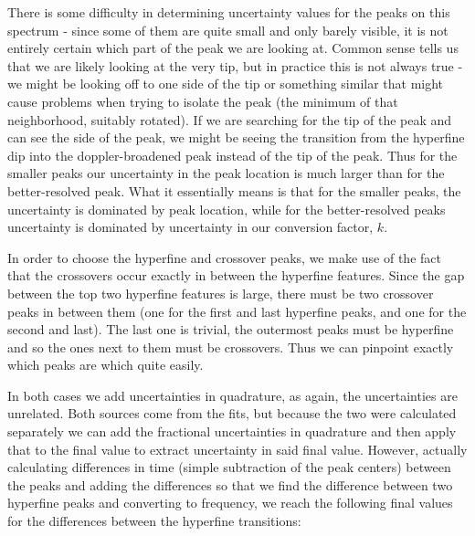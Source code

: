\documentclass{article}
\begin{document}
  There is some difficulty in determining uncertainty values for the peaks on this spectrum - since some of them are quite small and only barely visible, it is not entirely certain which part of the peak we are looking at.  Common sense tells us that we are likely looking at the very tip, but in practice this is not always true - we might be looking off to one side of the tip or something similar that might cause problems when trying to isolate the peak (the minimum of that neighborhood, suitably rotated).  If we are searching for the tip of the peak and can see the side of the peak, we might be seeing the transition from the hyperfine dip into the doppler-broadened peak instead of the tip of the peak.  Thus for the smaller peaks our uncertainty in the peak location is much larger than for the better-resolved peak.  What it essentially means is that for the smaller peaks, the uncertainty is dominated by peak location, while for the better-resolved peaks uncertainty is dominated by uncertainty in our conversion factor, $k$.

  \hspace{.25cm}

  In order to choose the hyperfine and crossover peaks, we make use of the fact that the crossovers occur exactly in between the hyperfine features.  Since the gap between the top two hyperfine features is large, there must be two crossover peaks in between them (one for the first and last hyperfine peaks, and one for the second and last).  The last one is trivial, the outermost peaks must be hyperfine and so the ones next to them must be crossovers.  Thus we can pinpoint exactly which peaks are which quite easily.

  \hspace{.25cm}

  In both cases we add uncertainties in quadrature, as again, the uncertainties are unrelated.  Both sources come from the fits, but because the two were calculated separately we can add the fractional uncertainties in quadrature and then apply that to the final value to extract uncertainty in said final value.  However, actually calculating differences in time (simple subtraction of the peak centers) between the peaks and adding the differences so that we find the difference between two hyperfine peaks and converting to frequency, we reach the following final values for the differences between the hyperfine transitions:

  \hspace{.25cm}
\end{document}
